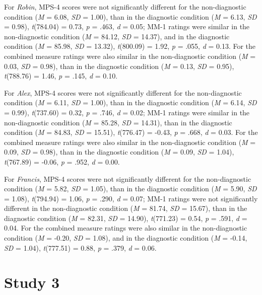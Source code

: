 \documentclass[
  american,
  man,floatsintext]{apa7}
\begin{document}
For \emph{Robin}, MPS-4 scores were not significantly different for the non-diagnostic condition (\emph{M} = 6.08, \emph{SD} = 1.00), than in the diagnostic condition (\emph{M} = 6.13, \emph{SD} = 0.98), \emph{t}(784.04) = 0.73, \emph{p} = .463, \emph{d} = 0.05; MM-1 ratings were similar in the non-diagnostic condition (\emph{M} = 84.12, \emph{SD} = 14.37), and in the diagnostic condition (\emph{M} = 85.98, \emph{SD} = 13.32), \emph{t}(800.09) = 1.92, \emph{p} = .055, \emph{d} = 0.13. For the combined measure ratings were also similar in the non-diagnostic condition (\emph{M} = 0.03, \emph{SD} = 0.98), than in the diagnostic condition (\emph{M} = 0.13, \emph{SD} = 0.95), \emph{t}(788.76) = 1.46, \emph{p} = .145, \emph{d} = 0.10.

For \emph{Alex}, MPS-4 scores were not significantly different for the non-diagnostic condition (\emph{M} = 6.11, \emph{SD} = 1.00), than in the diagnostic condition (\emph{M} = 6.14, \emph{SD} = 0.99), \emph{t}(737.60) = 0.32, \emph{p} = .746, \emph{d} = 0.02; MM-1 ratings were similar in the non-diagnostic condition (\emph{M} = 85.28, \emph{SD} = 14.31), than in the diagnostic condition (\emph{M} = 84.83, \emph{SD} = 15.51), \emph{t}(776.47) = -0.43, \emph{p} = .668, \emph{d} = 0.03. For the combined measure ratings were also similar in the non-diagnostic condition (\emph{M} = 0.09, \emph{SD} = 0.98), than in the diagnostic condition (\emph{M} = 0.09, \emph{SD} = 1.04), \emph{t}(767.89) = -0.06, \emph{p} = .952, \emph{d} = 0.00.

For \emph{Francis}, MPS-4 scores were not significantly different for the non-diagnostic condition (\emph{M} = 5.82, \emph{SD} = 1.05), than in the diagnostic condition (\emph{M} = 5.90, \emph{SD} = 1.08), \emph{t}(794.94) = 1.06, \emph{p} = .290, \emph{d} = 0.07; MM-1 ratings were not significantly different in the non-diagnostic condition (\emph{M} = 81.74, \emph{SD} = 15.67), than in the diagnostic condition (\emph{M} = 82.31, \emph{SD} = 14.90), \emph{t}(771.23) = 0.54, \emph{p} = .591, \emph{d} = 0.04. For the combined measure ratings were also similar in the non-diagnostic condition (\emph{M} = -0.20, \emph{SD} = 1.08), and in the diagnostic condition (\emph{M} = -0.14, \emph{SD} = 1.04), \emph{t}(777.51) = 0.88, \emph{p} = .379, \emph{d} = 0.06.

\newpage

\newpage

\hypertarget{study-3}{%
\section{Study 3}\label{study-3}}
\end{document}
